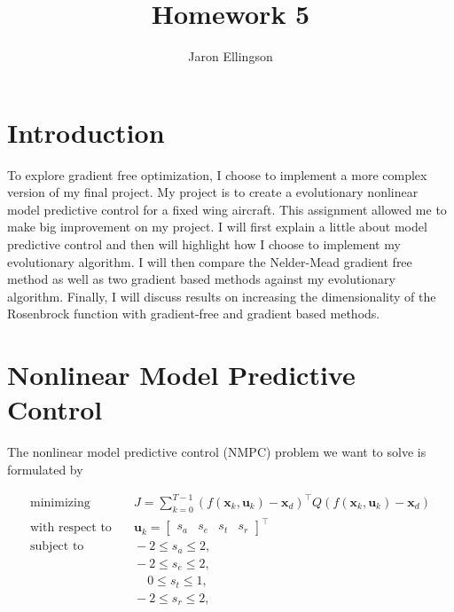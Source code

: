 \documentclass{article}
\begin{document}
\title{Homework 5}
\author{Jaron Ellingson}
\maketitle


\section*{Introduction}

To explore gradient free optimization, I choose to implement a more complex version of my final project. My project is to create a evolutionary nonlinear model predictive control for a fixed wing aircraft. This assignment allowed me to make big improvement on my project. I will first explain a little about model predictive control and then will highlight how I choose to implement my evolutionary algorithm. I will then compare the Nelder-Mead gradient free method as well as two gradient based methods against my evolutionary algorithm. Finally, I will discuss results on increasing the dimensionality of the Rosenbrock function with gradient-free and gradient based methods.


\section*{Nonlinear Model Predictive Control}

The nonlinear model predictive control (NMPC) problem we want to solve is formulated by

\begin{equation}
\label{eq:objective}
\begin{aligned}
\text{minimizing} & \quad J= \sum_{k=0}^{T-1} (f(\mathbf{x}_k,\mathbf{u}_k)-\mathbf{x}_{d})^{\top} Q (f(\mathbf{x}_k,\mathbf{u}_k)-\mathbf{x}_{d}) \\
\text{with respect to} & \quad \mathbf{u}_k =\begin{bmatrix}s_{a} & s_{e} & s_{t} & s_{r}\end{bmatrix}^{\top} \\
\text{subject to} & \quad -2 \le s_{a} \le 2, \\
& \quad -2 \le s_{e} \le 2, \\
& \quad \hspace{13pt} 0 \le s_{t} \le 1, \\
& \quad -2 \le s_{r} \le 2,
\end{aligned}
\end{equation}
\end{document}
